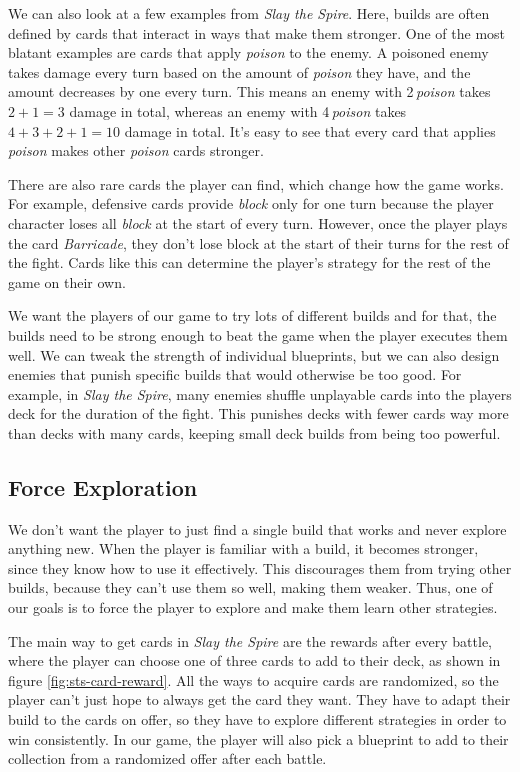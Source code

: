 We can also look at a few examples from \emph{Slay the Spire}.
Here, builds are often defined by cards that interact in ways that make them stronger.
One of the most blatant examples are cards that apply \emph{poison} to the enemy.
A poisoned enemy takes damage every turn based on the amount of \emph{poison} they have, and the amount decreases by one every turn.
This means an enemy with 2\,\emph{poison} takes $2 + 1 = 3$ damage in total, whereas an enemy with 4\,\emph{poison} takes $4 + 3 + 2 + 1 = 10$ damage in total.
It's easy to see that every card that applies \emph{poison} makes other \emph{poison} cards stronger.

There are also rare cards the player can find, which change how the game works.
For example, defensive cards provide \emph{block} only for one turn because the player character loses all \emph{block} at the start of every turn.
However, once the player plays the card \emph{Barricade}, they don't lose block at the start of their turns for the rest of the fight.
Cards like this can determine the player's strategy for the rest of the game on their own.

We want the players of our game to try lots of different builds and for that, the builds need to be strong enough to beat the game when the player executes them well.
We can tweak the strength of individual blueprints, but we can also design enemies that punish specific builds that would otherwise be too good.
For example, in \emph{Slay the Spire}, many enemies shuffle unplayable cards into the players deck for the duration of the fight.
This punishes decks with fewer cards way more than decks with many cards, keeping small deck builds from being too powerful.

\subsection{Force Exploration} \label{sec:goal-force-exploration}

We don't want the player to just find a single build that works and never explore anything new.
When the player is familiar with a build, it becomes stronger, since they know how to use it effectively.
This discourages them from trying other builds, because they can't use them so well, making them weaker.
Thus, one of our goals is to force the player to explore and make them learn other strategies.

The main way to get cards in \emph{Slay the Spire} are the rewards after every battle, where the player can choose one of three cards to add to their deck, as shown in figure \ref{fig:sts-card-reward}.
All the ways to acquire cards are randomized, so the player can't just hope to always get the card they want.
They have to adapt their build to the cards on offer, so they have to explore different strategies in order to win consistently.
In our game, the player will also pick a blueprint to add to their collection from a randomized offer after each battle.

